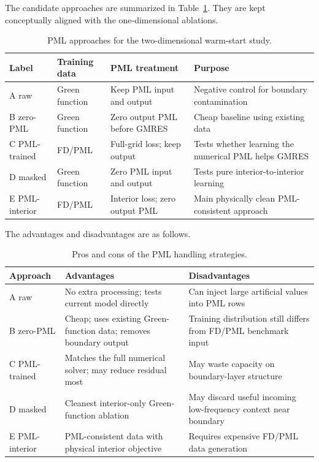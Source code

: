 The candidate approaches are summarized in
Table~\ref{tab:twod_pml_approaches}. They are kept conceptually aligned with
the one-dimensional ablations.
\begin{table}[h]
\centering
\begin{tabular}{llll}
\toprule
Label & Training data & PML treatment & Purpose \\
\midrule
A raw &
Green function &
Keep PML input and output &
Negative control for boundary contamination \\
B zero-PML &
Green function &
Zero output PML before GMRES &
Cheap baseline using existing data \\
C PML-trained &
FD/PML &
Full-grid loss; keep output &
Tests whether learning the numerical PML helps GMRES \\
D masked &
Green function &
Zero PML input and output &
Tests pure interior-to-interior learning \\
E PML-interior &
FD/PML &
Interior loss; zero output PML &
Main physically clean PML-consistent approach \\
\bottomrule
\end{tabular}
\caption{PML approaches for the two-dimensional warm-start study.}
\label{tab:twod_pml_approaches}
\end{table}

The advantages and disadvantages are as follows.
\begin{table}[h]
\centering
\begin{tabular}{lll}
\toprule
Approach & Advantages & Disadvantages \\
\midrule
A raw &
No extra processing; tests current model directly &
Can inject large artificial values into PML rows \\
B zero-PML &
Cheap; uses existing Green-function data; removes boundary output &
Training distribution still differs from FD/PML benchmark input \\
C PML-trained &
Matches the full numerical solver; may reduce residual most &
May waste capacity on boundary-layer structure \\
D masked &
Cleanest interior-only Green-function ablation &
May discard useful incoming low-frequency context near boundary \\
E PML-interior &
PML-consistent data with physical interior objective &
Requires expensive FD/PML data generation \\
\bottomrule
\end{tabular}
\caption{Pros and cons of the PML handling strategies.}
\label{tab:twod_pml_pros_cons}
\end{table}

